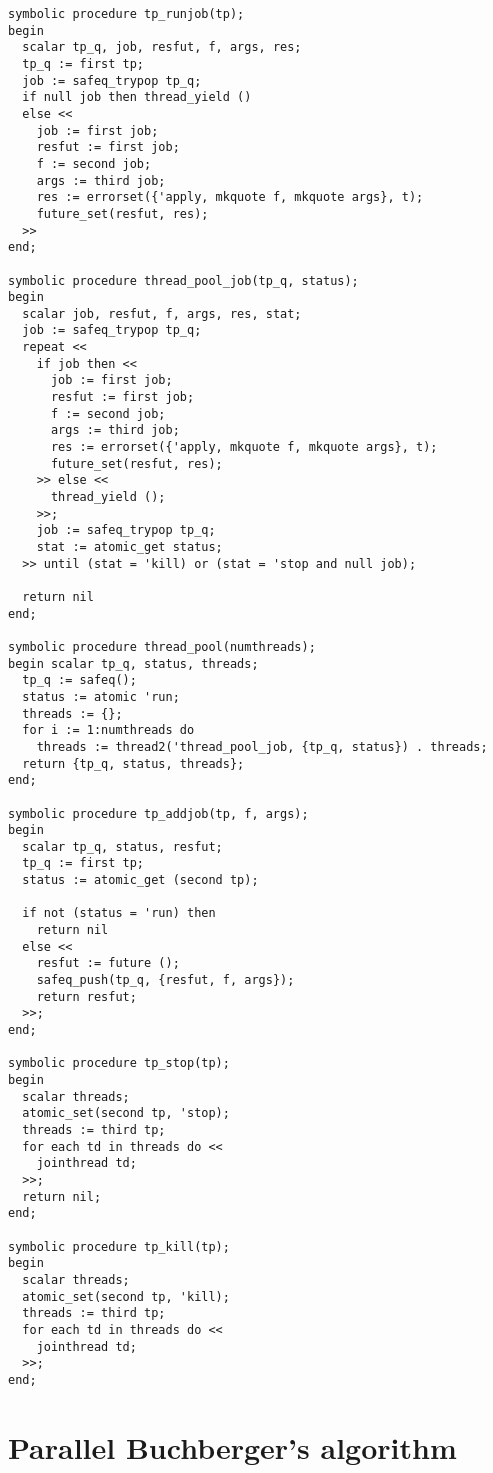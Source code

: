 \begin{code}
\begin{verbatim}
symbolic procedure tp_runjob(tp);
begin
  scalar tp_q, job, resfut, f, args, res;
  tp_q := first tp;
  job := safeq_trypop tp_q;
  if null job then thread_yield ()
  else <<
    job := first job;
    resfut := first job;
    f := second job;
    args := third job;
    res := errorset({'apply, mkquote f, mkquote args}, t);
    future_set(resfut, res);
  >>
end;

symbolic procedure thread_pool_job(tp_q, status);
begin
  scalar job, resfut, f, args, res, stat;
  job := safeq_trypop tp_q;
  repeat <<
    if job then <<
      job := first job;
      resfut := first job;
      f := second job;
      args := third job;
      res := errorset({'apply, mkquote f, mkquote args}, t);
      future_set(resfut, res);
    >> else <<
      thread_yield ();
    >>;
    job := safeq_trypop tp_q;
    stat := atomic_get status;
  >> until (stat = 'kill) or (stat = 'stop and null job);

  return nil
end;

symbolic procedure thread_pool(numthreads);
begin scalar tp_q, status, threads;
  tp_q := safeq();
  status := atomic 'run;
  threads := {};
  for i := 1:numthreads do
    threads := thread2('thread_pool_job, {tp_q, status}) . threads;
  return {tp_q, status, threads};
end;

symbolic procedure tp_addjob(tp, f, args);
begin
  scalar tp_q, status, resfut;
  tp_q := first tp;
  status := atomic_get (second tp);

  if not (status = 'run) then
    return nil
  else <<
    resfut := future ();
    safeq_push(tp_q, {resfut, f, args});
    return resfut;
  >>;
end;

symbolic procedure tp_stop(tp);
begin
  scalar threads;
  atomic_set(second tp, 'stop);
  threads := third tp;
  for each td in threads do <<
    jointhread td;
  >>;
  return nil;
end;

symbolic procedure tp_kill(tp);
begin
  scalar threads;
  atomic_set(second tp, 'kill);
  threads := third tp;
  for each td in threads do <<
    jointhread td;
  >>;
end;
\end{verbatim}
\end{code}

\section{Parallel Buchberger's algorithm}
\label{sec:buchberger}

